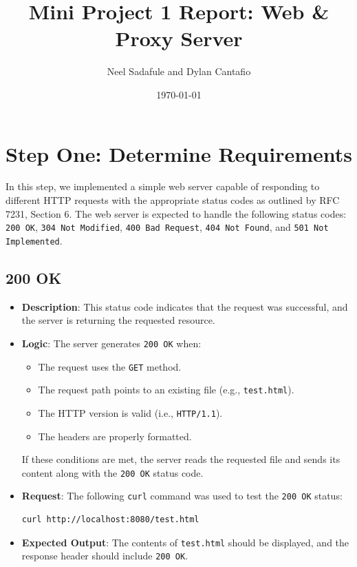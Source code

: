 \documentclass{article}
\title{Mini Project 1 Report: Web \& Proxy Server}
\author{Neel Sadafule and Dylan Cantafio}
\date{\today}
\begin{document}
\maketitle

\section*{Step One: Determine Requirements}

In this step, we implemented a simple web server capable of responding to different HTTP requests with the appropriate status codes as outlined by RFC 7231, Section 6. The web server is expected to handle the following status codes: \texttt{200 OK}, \texttt{304 Not Modified}, \texttt{400 Bad Request}, \texttt{404 Not Found}, and \texttt{501 Not Implemented}.

\subsection*{200 OK}

\begin{itemize}
    \item \textbf{Description}: This status code indicates that the request was successful, and the server is returning the requested resource.
    \item \textbf{Logic}: 
    The server generates \texttt{200 OK} when:
    \begin{itemize}
        \item The request uses the \texttt{GET} method.
        \item The request path points to an existing file (e.g., \texttt{test.html}).
        \item The HTTP version is valid (i.e., \texttt{HTTP/1.1}).
        \item The headers are properly formatted.
    \end{itemize}
    If these conditions are met, the server reads the requested file and sends its content along with the \texttt{200 OK} status code.
    \item \textbf{Request}: The following \texttt{curl} command was used to test the \texttt{200 OK} status:
\begin{lstlisting}
curl http://localhost:8080/test.html
\end{lstlisting}
    \item \textbf{Expected Output}: The contents of \texttt{test.html} should be displayed, and the response header should include \texttt{200 OK}.
\end{itemize}
\end{document}

